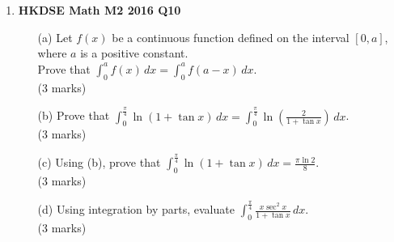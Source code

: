\documentclass[12pt]{article}
\begin{document}
\begin{enumerate}
	\item \textbf{HKDSE Math M2 2016 Q10}
	\begin{enumerate}
		\item [(a)]Let $f(x)$ be a continuous function defined on the interval $[0,a]$, where $a$ is a positive constant. \\Prove that $\int_0^a f(x)\,dx = \int_0^a f(a-x)\,dx$. \\(3 marks)
		\item [(b)]Prove that $\displaystyle\int_{ 0}^{\frac{\pi}{4}} \ln{(1+\tan{x})}\,dx = \int_{0}^{\frac{\pi}{4}} \ln{\left(\frac{2}{1+\tan{x}}\right)}\,dx$. \\(3 marks)
		\item [(c)]Using (b), prove that $\displaystyle\int_{0}^{\frac{\pi}{4}} \ln {(1+\tan{x})}\,dx = \frac{\pi \ln 2}{8}$. \\(3 marks)
		\item [(d)]Using integration by parts, evaluate $\displaystyle\int_{ 0}^{\frac{\pi}{4}} \frac{x\sec^2{x}}{1+\tan{x}}\,dx$. \\(3 marks)
	\end{enumerate}


\end{enumerate}
\end{document}
